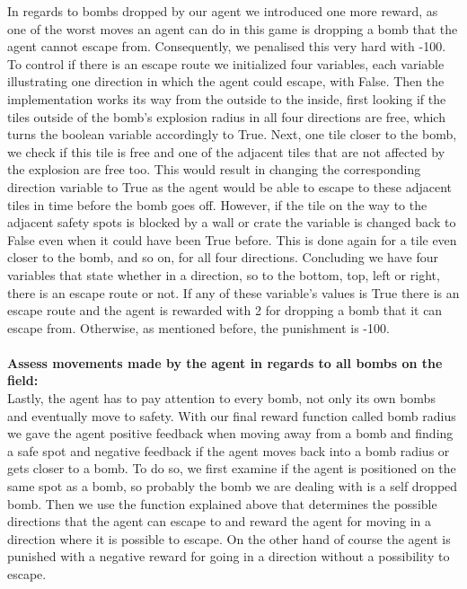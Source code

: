 \noindent In regards to bombs dropped by our agent we introduced one more reward, as one of the worst moves an agent can do in this game is dropping a bomb that the agent cannot escape from. Consequently, we penalised this very hard with -100. To control if there is an escape route we initialized four variables, each variable illustrating one direction in which the agent could escape, with False. Then the implementation works its way from the outside to the inside, first looking if the tiles outside of the bomb's explosion radius in all four directions are free, which turns the boolean variable accordingly to True. Next, one tile closer to the bomb, we check if this tile is free and one of the adjacent tiles that are not affected by the explosion are free too. This would result in changing the corresponding direction variable to True as the agent would be able to escape to these adjacent tiles in time before the bomb goes off. However, if the tile on the way to the adjacent safety spots is blocked by a wall or crate the variable is changed back to False even when it could have been True before. This is done again for a tile even closer to the bomb, and so on, for all four directions. Concluding we have four variables that state whether in a direction, so to the bottom, top, left or right, there is an escape route or not. If any of these variable's values is True there is an escape route and the agent is rewarded with 2 for dropping a bomb that it can escape from. Otherwise, as mentioned before, the punishment is -100.
\\ \\
\textbf{Assess movements made by the agent in regards to all bombs on the field:} \\

\noindent Lastly, the agent has to pay attention to every bomb, not only its own bombs and eventually move to safety. With our final reward function called bomb radius we gave the agent positive feedback when moving away from a bomb and finding a safe spot and negative feedback if the agent moves back into a bomb radius or gets closer to a bomb. To do so, we first examine if the agent is positioned on the same spot as a bomb, so probably the bomb we are dealing with is a self dropped bomb. Then we use the function explained above that determines the possible directions that the agent can escape to and reward the agent for moving in a direction where it is possible to escape. On the other hand of course the agent is punished with a negative reward for going in a direction without a possibility to escape. 

